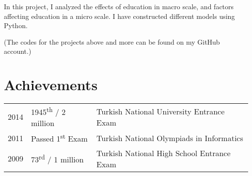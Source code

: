 \documentclass[letterpaper]{deedy-resume} %
\begin{document}
\begin{minipage}[t]{0.66\textwidth}
In this project, I analyzed the effects of education in macro scale, and factors affecting education in a micro scale. I have constructed different models using Python.

\sectionspace %

(The codes for the projects above and more can be found on my GitHub account.)

\sectionspace %


\section{Achievements} 

\begin{tabular}{rll}
2014	& 1945\textsuperscript{th} / 2 million	& Turkish National University Entrance Exam \\
2011	& Passed 1\textsuperscript{st} Exam 	& Turkish National Olympiads in Informatics \\
2009	& 73\textsuperscript{rd} / 1 million	& Turkish National High School Entrance Exam \\
\end{tabular}

\sectionspace %


\end{minipage} %








\end{document}
